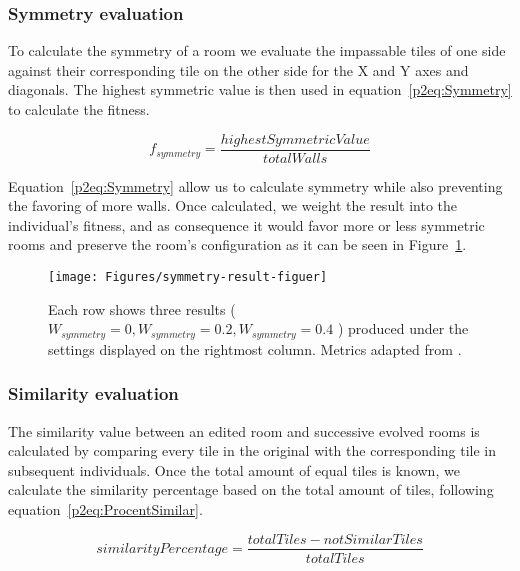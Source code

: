 \subsubsection{Symmetry evaluation}


To calculate the symmetry of a room we evaluate the impassable tiles of one side against their corresponding tile on the other side for the X and Y axes and diagonals. The highest symmetric value is then used in equation~\ref{p2eq:Symmetry} to calculate the fitness.

\begin{equation} \label{p2eq:Symmetry}
f_{symmetry} = \frac{highestSymmetricValue} {totalWalls}
\end{equation}

Equation~\ref{p2eq:Symmetry} allow us to calculate symmetry while also preventing the favoring of more walls. Once calculated, we weight the result into the individual's fitness, and as consequence it would favor more or less symmetric rooms and preserve the room's configuration as it can be seen in Figure~\ref{p2fig:symmetry-result}.

\begin{figure}
\texttt{[image: Figures/symmetry-result-figuer]}
\caption{Each row shows three results (\(W_{symmetry}=0, W_{symmetry}=0.2, W_{symmetry}=0.4\) ) produced under the settings displayed on the rightmost column. Metrics adapted from \cite{p2Baldwin2017Mixed-initiativePatterns}.}
\label{p2fig:symmetry-result}
\end{figure}

\subsubsection{Similarity evaluation}

The similarity value between an edited room and successive evolved rooms is calculated by comparing every tile in the original with the corresponding tile in subsequent individuals. Once the total amount of equal tiles is known, we calculate the similarity percentage based on the total amount of tiles, following equation~\ref{p2eq:ProcentSimilar}. 

\begin{equation} \label{p2eq:ProcentSimilar}
similarityPercentage = \frac{totalTiles - notSimilarTiles} {totalTiles}
\end{equation}

